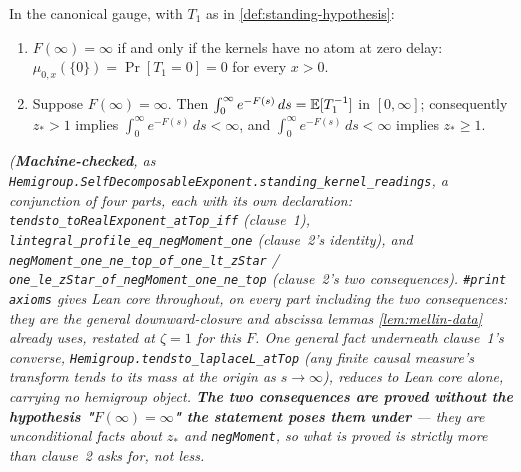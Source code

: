 \begin{lemma}\label{lem:standing-kernel-readings}
\leanok
In the canonical gauge, with $T_1$ as in \ref{def:standing-hypothesis}:
\begin{enumerate}
\item $F(\infty) = \infty$ if and only if the kernels have no atom at zero delay:
$\mu_{0,x}(\{0\}) = \Pr[T_1 = 0] = 0$ for every $x > 0$.
\item Suppose $F(\infty) = \infty$. Then $\int_0^\infty e^{-F(s)}\,ds = \mathbb{E}[T_1^{-1}]$ in
$[0,\infty]$; consequently $z_* > 1$ implies $\int_0^\infty e^{-F(s)}\,ds < \infty$, and
$\int_0^\infty e^{-F(s)}\,ds < \infty$ implies $z_* \ge 1$.
\end{enumerate}
\statusT\quad\emph{(\textbf{Machine-checked}, as
\texttt{Hemigroup.SelfDecomposableExponent.standing\_kernel\_readings}, a conjunction of four
parts, each with its own declaration: \texttt{tendsto\_toRealExponent\_atTop\_iff} (clause~1),
\texttt{lintegral\_profile\_eq\_negMoment\_one} (clause~2's identity), and
\texttt{negMoment\_one\_ne\_top\_of\_one\_lt\_zStar} /
\texttt{one\_le\_zStar\_of\_negMoment\_one\_ne\_top} (clause~2's two consequences).
\texttt{\#print axioms} gives Lean core throughout, on every part including the two
consequences: they are the general downward-closure and abscissa lemmas
\ref{lem:mellin-data} already uses, restated at $\zeta = 1$ for \emph{this} $F$. One general fact underneath clause~1's converse,
\texttt{Hemigroup.tendsto\_laplaceL\_atTop} (any finite causal measure's transform tends to its
mass at the origin as $s \to \infty$), reduces to Lean core alone, carrying no hemigroup object.
\textbf{The two consequences are proved without the hypothesis "$F(\infty)=\infty$" the statement
poses them under} --- they are unconditional facts about $z_*$ and \texttt{negMoment}, so what is
proved is strictly more than clause~2 asks for, not less.}
\end{lemma}

